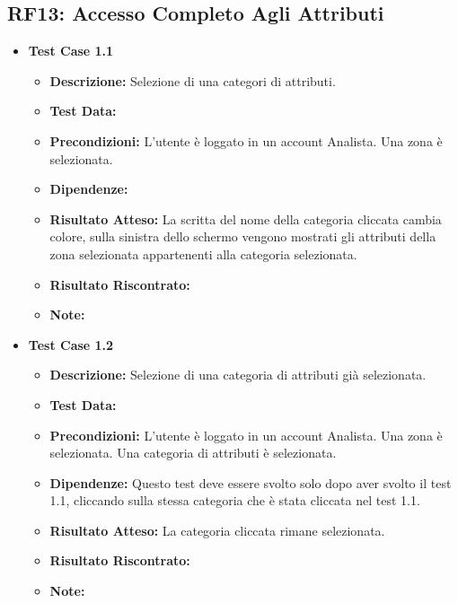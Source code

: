     \subsection{RF13: Accesso Completo Agli Attributi}
        \begin{itemize}
            \item \textbf{Test Case 1.1}
                \begin{itemize}
                    \item \textbf{Descrizione:} Selezione di una categori di attributi.
                    \item \textbf{Test Data:}
                    \item \textbf{Precondizioni:} L'utente è loggato in un account Analista. Una zona è selezionata.
                    \item \textbf{Dipendenze:}
                    \item \textbf{Risultato Atteso:} La scritta del nome della categoria cliccata cambia colore, sulla sinistra dello schermo vengono mostrati gli attributi della zona selezionata appartenenti alla categoria selezionata.
                    \item \textbf{Risultato Riscontrato:}
                    \item \textbf{Note:}
                \end{itemize}
            \item \textbf{Test Case 1.2}
                \begin{itemize}
                    \item \textbf{Descrizione:} Selezione di una categoria di attributi già selezionata.
                    \item \textbf{Test Data:}
                    \item \textbf{Precondizioni:} L'utente è loggato in un account Analista. Una zona è selezionata. Una categoria di attributi è selezionata.
                    \item \textbf{Dipendenze:} Questo test deve essere svolto solo dopo aver svolto il test 1.1, cliccando sulla stessa categoria che è stata cliccata nel test 1.1.
                    \item \textbf{Risultato Atteso:} La categoria cliccata rimane selezionata.
                    \item \textbf{Risultato Riscontrato:}
                    \item \textbf{Note:}
                \end{itemize}
        \end{itemize}
